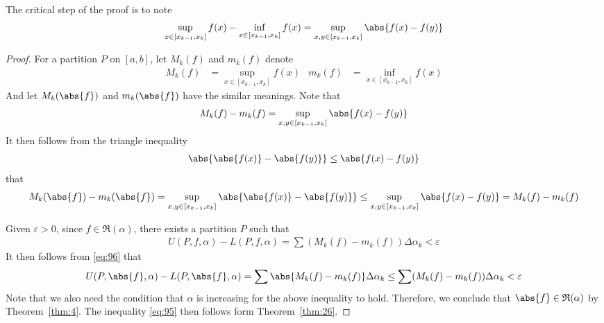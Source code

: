 \documentclass[thmcnt=section, 12pt]{elegantbook}
\begin{document}
\par The critical step of the proof is to note 
\begin{align*}
    \sup_{x \in [x_{k-1}, x_k]} f(x) - \inf_{x \in [x_{k-1}, x_k]} f(x) 
    = \sup_{x,y \in [x_{k-1}, x_k]} \abs{f(x) - f(y)} 
\end{align*}

\begin{proof}
    For a partition $P$ on $[a, b]$, let $M_k(f)$ and $m_k(f)$ denote 
    \begin{align*}
        M_k(f) &= \sup_{x \in [x_{k-1}, x_k]} f(x) &
        m_k(f) &= \inf_{x \in [x_{k-1}, x_k]} f(x)
    \end{align*}
    And let $M_k(\abs{f})$ and $m_k(\abs{f})$ have the similar meanings. Note that 
    \begin{align*}
        M_k(f) - m_k(f) = \sup_{x,y \in [x_{k-1}, x_k]} \abs{f(x) - f(y)} 
    \end{align*}
    It then follows from the triangle inequality
    \begin{align*}
        \abs{\abs{f(x)} - \abs{f(y)}}
        \leq \abs{f(x) - f(y)}
    \end{align*}
    that 
    \begin{align}
        M_k(\abs{f}) - m_k(\abs{f}) 
        = \sup_{x,y \in [x_{k-1}, x_k]}\abs{\abs{f(x)} - \abs{f(y)}}
        \leq \sup_{x,y \in [x_{k-1}, x_k]}\abs{f(x) - f(y)}
        = M_k(f) - m_k(f)
        \label{eq:96}
    \end{align}

    \par Given $\varepsilon > 0$, since $f \in \mathfrak{R}(\alpha)$, there exists a partition $P$ such that  
    \begin{align*}
        U(P, f, \alpha) - L(P, f, \alpha)
        = \sum (M_k(f) - m_k(f)) \Delta\alpha_k
        < \varepsilon
    \end{align*}
    It then follows from \eqref{eq:96} that 
    \begin{align*}
        U(P, \abs{f}, \alpha) - L(P, \abs{f}, \alpha)
        = \sum \abs{M_k(f) - m_k(f)} \Delta\alpha_k
        \leq \sum (M_k(f) - m_k(f)) \Delta\alpha_k
        < \varepsilon
    \end{align*}
    Note that we also need the condition that $\alpha$ is increasing for the above inequality to hold. Therefore, we conclude that $\abs{f} \in \mathfrak{R}(\alpha)$ by Theorem~\ref{thm:4}. The inequality \eqref{eq:95} then follows form Theorem~\ref{thm:26}.
\end{proof}
\end{document}
